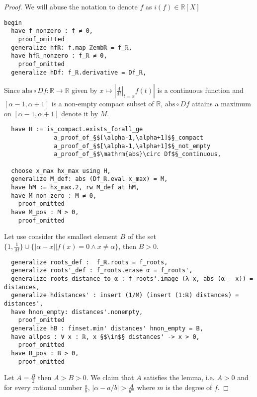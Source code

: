 \documentclass{report}
\theoremstyle{definition}
\theoremstyle{plain}
\begin{document}
\begin{proof}
We will abuse the notation to denote $f$ as $i(f)\in\mathbb{R}[X]$
\begin{verbatim}
begin
  have f_nonzero : f ≠ 0,
    proof_omitted
  generalize hfℝ: f.map ℤembℝ = f_ℝ,
  have hfℝ_nonzero : f_ℝ ≠ 0,
    proof_omitted
  generalize hDf: f_ℝ.derivative = Df_ℝ,
\end{verbatim}

Since $\mathrm{abs}\circ Df : \mathbb R\to\mathbb R$ given by $x\mapsto \left|\left.\frac{\mathrm d}{\mathrm d t}\right|_{t=x}f(t)\right|$ is a continuous function and $[\alpha-1,\alpha+1]$ is a non-empty compact subset of $\mathbb R$, $\mathrm{abs} \circ Df$ attains a maximum on $[\alpha-1,\alpha+1]$ denote it by $M$.

\begin{verbatim}
  have H := is_compact.exists_forall_ge 
              a_proof_of_§$[\alpha-1,\alpha+1]$§_compact
              a_proof_of_§$[\alpha-1,\alpha+1]$§_not_empty
              a_proof_of_§$\mathrm{abs}\circ Df$§_continuous,

  choose x_max hx_max using H,
  generalize M_def: abs (Df_ℝ.eval x_max) = M,
  have hM := hx_max.2, rw M_def at hM,
  have M_non_zero : M ≠ 0,
    proof_omitted
  have M_pos : M > 0,
    proof_omitted
\end{verbatim}

Let use consider the smallest element $B$ of the set $\{1, \frac 1 M\}\cup\{\left|\alpha-x\right|| f(x)=0 \land x\ne\alpha\}$, then $B>0$.
\begin{verbatim}
  generalize roots_def :  f_ℝ.roots = f_roots,
  generalize roots'_def : f_roots.erase α = f_roots',
  generalize roots_distance_to_α : f_roots'.image (λ x, abs (α - x)) = distances,
  generalize hdistances' : insert (1/M) (insert (1:ℝ) distances) = distances',
  have hnon_empty: distances'.nonempty, 
    proof_omitted
  generalize hB : finset.min' distances' hnon_empty = B,
  have allpos : ∀ x : ℝ, x §$\in$§ distances' -> x > 0,
    proof_omitted
  have B_pos : B > 0,
    proof_omitted
\end{verbatim}

Let $A=\frac B 2$ then $A > B > 0$. We claim that $A$ satisfies the lemma, i.e. $A>0$ and for every rational number $\frac ab$, $\left|\alpha-a/b\right|>\frac A{b^m}$ where $m$ is the degree of $f$.


\end{proof}
\end{document}
